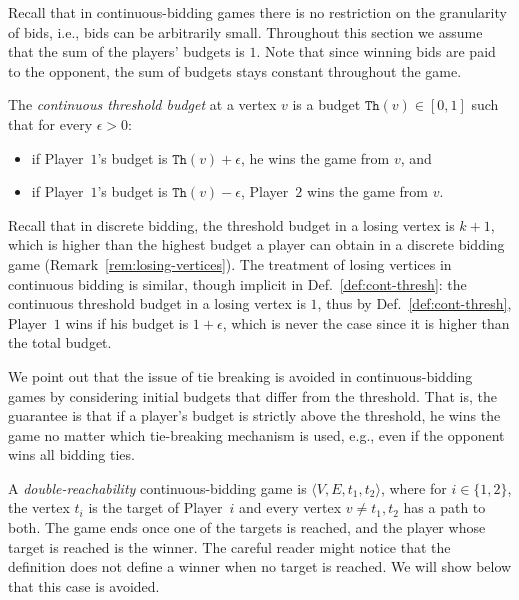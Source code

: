 \documentclass{theoretics}
\newcommand{\PO}{Player~$1$\xspace}
\newcommand{\PT}{Player~$2$\xspace}
\newcommand{\PLi}{Player~$i$\xspace}
\newcommand{\thresh}{\texttt{Th}\xspace}
\newcommand{\zug}[1]{\langle #1  \rangle}
\renewcommand{\set}[1]{\{ #1  \}}
\begin{document}
Recall that in continuous-bidding games there is no restriction on the granularity of bids, i.e., bids can be arbitrarily small. Throughout this section we assume that the sum of the players' budgets is $1$. Note that since winning bids are paid to the opponent, the sum of budgets stays constant throughout the game. 

\begin{definition}\label{def:cont-thresh}
The {\em continuous threshold budget} at a vertex $v$ is a budget $\thresh(v) \in [0,1]$ such that for every $\epsilon > 0$: 
\begin{itemize}
\item if \PO's budget is $\thresh(v) + \epsilon$, he wins the game from $v$, and 
\item if \PO's budget is $\thresh(v) - \epsilon$, \PT wins the game from $v$.
\end{itemize}
\end{definition}

\begin{remark}
Recall that in discrete bidding, the threshold budget in a losing vertex is $k+1$, which is higher than the highest budget a player can obtain in a discrete bidding game (Remark~\ref{rem:losing-vertices}). 
The treatment of losing vertices in continuous bidding is similar, though implicit in Def.~\ref{def:cont-thresh}: the continuous threshold budget in a losing vertex is $1$, thus by Def.~\ref{def:cont-thresh}, \PO wins if his budget is $1+\epsilon$, which is never the case since it is higher than the total budget. 
\end{remark}


\begin{remark}
We point out that the issue of tie breaking is avoided in continuous-bidding games by considering initial budgets that differ from the threshold. 
That is, the guarantee is that if a player's budget is strictly above the threshold, he wins the game no matter which tie-breaking mechanism is used, e.g., even if the opponent wins all bidding ties. 
\end{remark}

A {\em double-reachability} continuous-bidding game is $\zug{V, E, t_1, t_2}$, where for $i \in \set{1,2}$, the vertex $t_i$ is the target of \PLi and every vertex $v \neq t_1,t_2$ has a path to both. The game ends once one of the targets is reached, and the player whose target is reached is the winner. The careful reader might notice that the definition does not define a winner when no target is reached. We will show below that this case is avoided.
\end{document}
